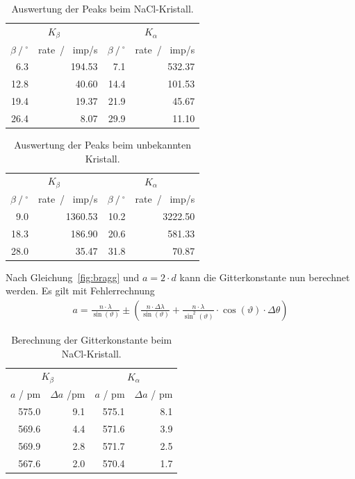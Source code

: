 \documentclass{article}
\begin{document}
\begin{table}[H]
\centering
\caption{Auswertung der Peaks beim NaCl-Kristall.}
\label{tab:auswertung_nacl}
\begin{tabular}{rr|rr}
\multicolumn{2}{c|}{$K_\beta$} & \multicolumn{2}{c}{$K_\alpha$} \\ 
$\beta~/~^\circ$ & rate~/~ imp/s & $\beta~/~^\circ$ & rate~/~ imp/s \\
\hline
6.3 & 194.53 & 7.1 & 532.37 \\
12.8 & 40.60 & 14.4 & 101.53 \\
19.4 & 19.37 & 21.9 & 45.67 \\
26.4 & 8.07 & 29.9 & 11.10
\end{tabular}
\label{tab:peaks_nacl}
\end{table}


\begin{table}[H]
\centering
\caption{Auswertung der Peaks beim unbekannten Kristall.}\label{tab:auswertung_unkonwn}
\begin{tabular}{rr|rr}
\multicolumn{2}{c|}{$K_\beta$} & \multicolumn{2}{c}{$K_\alpha$} \\ 
$\beta~/~^\circ$ & rate~/~ imp/s & $\beta~/~^\circ$ & rate~/~ imp/s \\
\hline
9.0 & 1360.53 & 10.2 & 3222.50 \\
18.3 & 186.90 & 20.6 & 581.33 \\
28.0 & 35.47 & 31.8 & 70.87
\end{tabular}
\label{tab:peaks_kristall}
\end{table}




Nach Gleichung~\eqref{fig:bragg} und $a=2\cdot d$ kann die Gitterkonstante nun berechnet werden. Es gilt mit Fehlerrechnung
\begin{align}
a = \frac{n\cdot \lambda}{\sin(\vartheta)} \pm \left( \frac{n\cdot \Delta \lambda}{\sin(\vartheta)} + \frac{n\cdot \lambda}{\sin^2(\vartheta)}\cdot \cos(\vartheta) \cdot \Delta \theta\right)
\label{eq:gitterkonst_fehler} 
\end{align}



\begin{table}[H]
\centering
\caption{Berechnung der Gitterkonstante beim NaCl-Kristall.}
\label{tab:gitterkonst_nacl}
\begin{tabular}{rr|rr}
\multicolumn{2}{c|}{$K_\beta$} & \multicolumn{2}{c}{$K_\alpha$} \\ 
$a$ / pm & $\Delta a$ /pm & $a$ / pm & $\Delta a$ / pm\\
\hline
575.0 & 9.1 & 575.1 & 8.1 \\
569.6 & 4.4 & 571.6 & 3.9 \\
569.9 & 2.8 & 571.7 & 2.5 \\
567.6 & 2.0 & 570.4 & 1.7 
\end{tabular}
\end{table}
\end{document}
